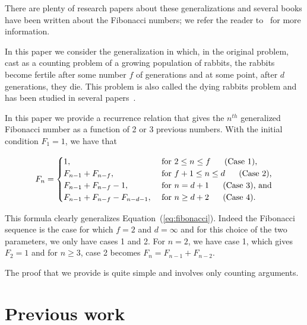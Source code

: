 \documentclass[11pt,epsf]{article}
\newcommand{\cfor}{{\text{ for }}}
\begin{document}
There are plenty of research papers about these generalizations and several books have been written about
the Fibonacci numbers; 
we refer the reader to~\cite{book:K2001,book:V1989} for more information.

\medskip

In this paper we consider the generalization in which, in the original problem, cast as a counting 
problem of a growing population of rabbits, the rabbits become fertile after some number $f$ of
generations and at some point, after $d$ generations, they die. This problem is also called the
dying rabbits problem and has been studied in several papers~\cite{A1963-1,A1963-4,C1964,H1968,HL1969,O2009}. 

\medskip
{} In this paper we provide a recurrence relation that
gives the $n^{th}$ generalized Fibonacci number as a function of 2 or 3 previous numbers. 
With the initial condition $F_1=1$, we have that

\begin{equation*}
F_n = 
\begin{cases}
1,                                         & \cfor 2\le n\le f \makebox{\ \ \ \ \ (Case 1),}\\
F_{n-1}+F_{n-f},                   & \cfor f+1\le n\le d \makebox{\ \ \ \ \ (Case 2),}\\
F_{n-1}+F_{n-f}-1,              & \cfor n=d+1  \makebox{\ \ \ \ \ (Case 3), and}\\
F_{n-1}+F_{n-f}-F_{n-d-1}, & \cfor n\ge d+2  \makebox{\ \ \ \ \ (Case 4)}.\\
\end{cases}
\end{equation*}

\medskip


\noindent
This formula clearly generalizes Equation~(\ref{eq:fibonacci}). Indeed the Fibonacci sequence
is the case for which $f=2$  and $d=\infty$ and for this choice of the two parameters, we only have 
cases 1 and 2. For $n=2$, we have case 1, which gives $F_2=1$ and for $n\ge 3$, case 2 becomes
$F_n= F_{n-1}+F_{n-2}.$

\noindent
The proof that we provide is quite simple and involves only counting arguments.

\section{Previous work}
\end{document}
